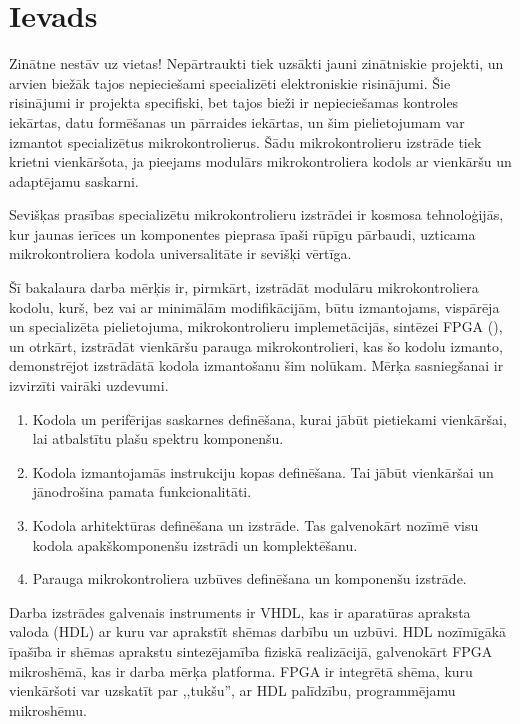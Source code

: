\section*{Ievads} 
Zinātne nestāv uz vietas! Nepārtraukti tiek uzsākti jauni zinātniskie projekti,
un arvien biežāk tajos nepieciešami specializēti elektroniskie risinājumi.
Šie risinājumi ir projekta specifiski, bet tajos bieži ir nepieciešamas
kontroles iekārtas, datu formēšanas un pārraides iekārtas, un
šim pielietojumam var izmantot specializētus mikrokontrolierus.
Šādu mikrokontrolieru izstrāde tiek krietni vienkāršota, ja pieejams
modulārs mikrokontroliera kodols ar vienkāršu un adaptējamu saskarni.

Sevišķas prasības specializētu mikrokontrolieru izstrādei ir kosmosa
tehnoloģijās, kur jaunas ierīces un komponentes pieprasa īpaši rūpīgu
pārbaudi, uzticama mikrokontroliera kodola universalitāte ir sevišķi
vērtīga.

Šī bakalaura darba mērķis ir, pirmkārt, izstrādāt modulāru mikrokontroliera kodolu,
kurš, bez vai ar minimālām modifikācijām, būtu izmantojams,
vispārēja un specializēta pielietojuma, mikrokontrolieru implemetācijās,
sintēzei FPGA (), un otrkārt,
izstrādāt vienkāršu parauga mikrokontrolieri, kas šo kodolu izmanto,
demonstrējot izstrādātā kodola izmantošanu šim nolūkam.
Mērķa sasniegšanai ir izvirzīti vairāki uzdevumi.
\begin{enumerate}
	\item Kodola un perifērijas saskarnes definēšana,
		kurai jābūt pietiekami vienkāršai, lai atbalstītu plašu spektru
		komponenšu.
	\item Kodola izmantojamās instrukciju kopas definēšana. Tai jābūt
		vienkāršai un jānodrošina pamata funkcionalitāti.
	\item Kodola arhitektūras definēšana un izstrāde. Tas galvenokārt nozīmē
		visu kodola apakškomponenšu izstrādi un komplektēšanu.
	\item Parauga mikrokontroliera uzbūves definēšana un komponenšu izstrāde.
\end{enumerate}

Darba izstrādes galvenais instruments ir VHDL, kas ir
aparatūras apraksta valoda (HDL) ar kuru var aprakstīt shēmas darbību un uzbūvi.
HDL nozīmīgākā īpašība ir shēmas aprakstu sintezējamība fiziskā realizācijā,
galvenokārt FPGA mikroshēmā, kas ir darba mērķa platforma.
FPGA ir integrētā shēma, kuru vienkāršoti var 
uzskatīt par ,,tukšu'', ar HDL palīdzību, programmējamu mikroshēmu.

